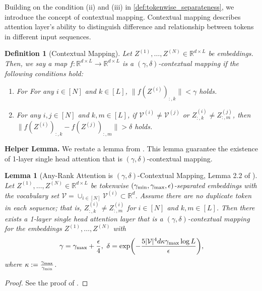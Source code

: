 \documentclass[12pt]{article}
\numberwithin{equation}{section}
\def\R{\mathbb{R}}
\let\cite\citep
\theoremstyle{theoremstyle}
\newtheorem{lemma}{Lemma}[section]
\newtheorem{definition}{Definition}[section]
\numberwithin{equation}{section}
\numberwithin{theorem}{section}
\numberwithin{proposition}{section}
\numberwithin{definition}{section}
\numberwithin{lemma}{section}
\numberwithin{assumption}{section}
\numberwithin{remark}{section}
\begin{document}
Building on the condition (ii) and (iii) in \cref{def:tokenwise_separateness}, we introduce the concept of contextual mapping.
Contextual mapping describes attention layer's ability to distinguish difference and relationship between tokens in different input sequences.

\begin{definition}[Contextual Mapping]
Let $Z^{(1)},\dots,Z^{(N)}\in\R^{d\times L}$ be embeddings.
Then, we say a map $f:\R^{d\times L}\to \R^{d\times L}$  is a $(\gamma,\delta)$-contextual mapping if the following conditions hold:
\begin{enumerate}
    \item [(i)] For For any $i\in[N]$ and $k\in[L]$, $\|f(Z^{(i)})_{:,k}\|<\gamma$ holds.

    \item [(ii)] For any $i,j\in[N]$ and $k,m\in[L]$, if $\mathcal{V}^{(i)}\neq\mathcal{V}^{(j)}$ or $Z^{(i)}_{:,k}\neq Z^{(j)}_{:,m}$, then $\|f(Z^{(i)})_{:,k}- f(Z^{(j)})_{:,m}\|>\delta$ holds.
\end{enumerate}

\end{definition}

\textbf{Helper Lemma.}
We restate a lemma from \cite{hu2024fundamental}.
This lemma guarantee the existence of 1-layer single head attention that is $(\gamma,\delta)$-contextual mapping.
\begin{lemma}[Any-Rank Attention is $(\gamma,\delta)$-Contextual Mapping, Lemma 2.2 of \cite{hu2024fundamental}]\label{lem:attention_is_contextual_mapping}
Let $Z^{(1)},\dots,Z^{(N)}\in\R^{d\times L}$ be tokenwise $(\gamma_{\rm min},\gamma_{\rm max},\epsilon)$-separated embeddings with the vocabulary set $\mathcal{V}=\cup_{i\in[N]}\mathcal{V}^{(i)}\subset\R^d$.
Assume there are no duplicate token in each sequence; that is, $Z^{(i)}_{:,k}\neq Z^{(i)}_{:,m}$ for $i\in[N]$ and $k,m\in[L]$.
Then there exists a 1-layer single head attention layer that is a $(\gamma,\delta)$-contextual mapping for the embeddings $Z^{(1)},\dots,Z^{(N)}$ with
\begin{align*}
    \gamma=\gamma_{\rm max}+\frac{\epsilon}{4}, ~ \delta=\exp(-\frac{5|\mathcal{V}|^4d\kappa\gamma_{\rm max}\log L}{\epsilon}),
\end{align*}
where $\kappa:=\frac{\gamma_{\rm max}}{\gamma_{\rm min}}$.
\end{lemma}

\begin{proof}
See the proof of \cite[Lemma 2.2]{hu2024fundamental}.
\end{proof}
\end{document}
